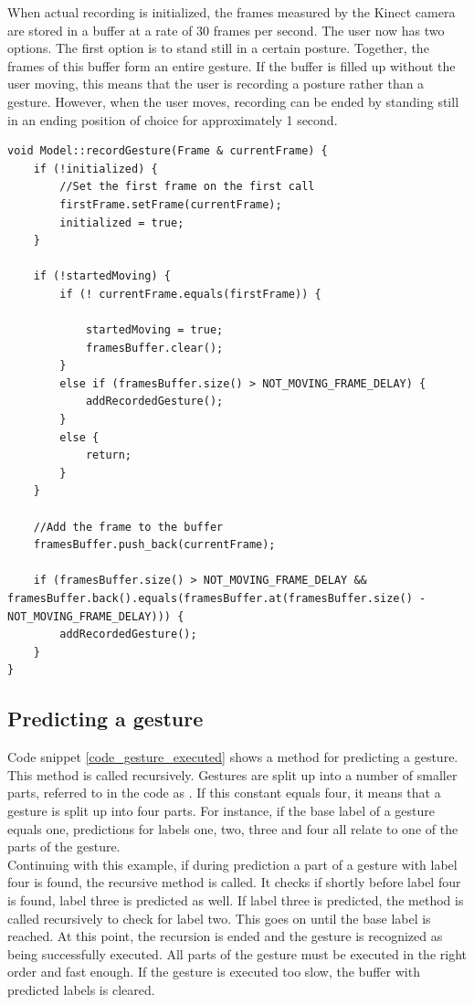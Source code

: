 When actual recording is initialized, the frames measured by the Kinect camera are stored in a buffer at a rate of 30 frames per second. The user now has two options. The first option is to stand still in a certain posture.        Together, the frames of this buffer form an entire gesture. If the buffer is filled up without the user moving, this means that the user is recording a posture rather than a gesture. However, when the user moves, recording can be ended by standing still in an ending position of choice for approximately 1 second.\\

\begin{lstlisting}[caption=method to record a gesture, label=code_record_gesture]
void Model::recordGesture(Frame & currentFrame) {
	if (!initialized) {
		//Set the first frame on the first call
		firstFrame.setFrame(currentFrame);
		initialized = true;
	}

	if (!startedMoving) {
		if (! currentFrame.equals(firstFrame)) {
		
			startedMoving = true;
			framesBuffer.clear();
		}
		else if (framesBuffer.size() > NOT_MOVING_FRAME_DELAY) {
			addRecordedGesture();
		}
		else {
			return;
		}
	}
	
	//Add the frame to the buffer
	framesBuffer.push_back(currentFrame);

	if (framesBuffer.size() > NOT_MOVING_FRAME_DELAY &&	framesBuffer.back().equals(framesBuffer.at(framesBuffer.size() - NOT_MOVING_FRAME_DELAY))) {
		addRecordedGesture();
	}
}
\end{lstlisting}


\subsection{Predicting a gesture}

Code snippet \ref{code_gesture_executed} shows a method for predicting a gesture. This method is called recursively. Gestures are split up into a number of smaller parts, referred to in the code as . If this constant equals four, it means that a gesture is split up into four parts. For instance, if the base label of a gesture equals one, predictions for labels one, two, three and four all relate to one of the parts of the gesture.\\

Continuing with this example, if during prediction a part of a gesture with label four is found, the recursive method  is called. It checks if shortly before label four is found, label three is predicted as well. If label three is predicted, the method is called recursively to check for label two. This goes on until the base label is reached. At this point, the recursion is ended and the gesture is recognized as being successfully executed. All parts of the gesture must be executed in the right order and fast enough. If the gesture is executed too slow, the buffer with predicted labels is cleared.\\

